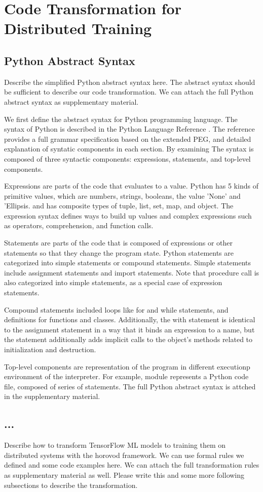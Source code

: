 \section{Code Transformation for Distributed Training}\label{sec:trans}
\subsection{Python Abstract Syntax}\label{sec:pysyn}
Describe the simplified Python abstract syntax here. 
The abstract syntax should be sufficient to describe our code transformation. 
We can attach the full Python abstract syntax as supplementary material.

We first define the abstract syntax for Python programming language.
The syntax of Python is described in the Python Language Reference \cite{pythonref}.
The reference provides a full grammar specification based on the extended PEG,
and detailed explanation of syntatic components in each section.
By examining  
The syntax is composed of three syntactic components: expressions, statements,
and top-level components.

Expressions are parts of the code that evaluates to a value.
Python has 5 kinds of primitive values, 
which are numbers, strings, booleans, the value 'None' and 'Ellipsis.
and has composite types of tuple, list, set, map, and object.
The expression syntax defines ways to build up values
and complex expressions such as operators, comprehension, and function calls. 

Statements are parts of the code that is composed of expressions or other
statements so that they change the program state.
Python statements are categorized into simple statements or compound statements.
Simple statements include assignment statements and import statements.
Note that procedure call is also categorized into simple statements,
as a special case of expression statements.

Compound statements included loops like for and while statements,
and definitions for functions and classes.
Additionally, the with statement is identical to the assignment statement 
in a way that it binds an expression to a name, 
but the statement additionally adds implicit calls
to the object's methods related to initialization and destruction.

Top-level components are representation of the program
in different executionp environment of the interpreter.
For example, module represents a Python code file, composed of
series of statements. 
The full Python abstract syntax is attched in the supplementary material.

\subsection{...}
Describe how to transform TensorFlow ML models to training them on distributed
systems with the horovod framework. We can use formal rules we defined and some
code examples here. We can attach the full transformation rules as
supplementary material as well.  Please write this and some more following
subsections to describe the transformation.
